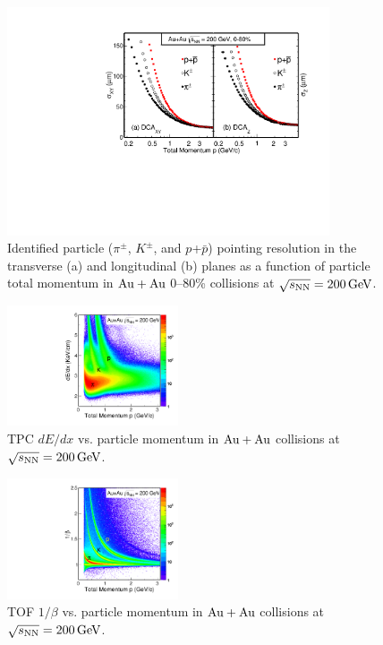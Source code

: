\documentclass[%
 reprint,	
 amsmath,amssymb,
 aps,
 prc,
]{revtex4-1}
\begin{document}
\begin{figure}
\centering
\includegraphics[width=0.85\textwidth]{fig/DCAXy_Z.pdf}
\caption{Identified particle ($\pi^{\pm}$, $K^{\pm}$, and $p$+$\bar{p}$) pointing resolution in the transverse (a) and longitudinal (b) planes as a function of particle total momentum in ${\rm{Au + Au}}$ 0--80\% collisions at ${\sqrt{s_{\rm NN}} = \rm{200\,GeV}}$.}
\label{fig:DCAXy_Z} 
\end{figure}

\begin{figure}[h]
\centering
\includegraphics[width=0.45\textwidth]{fig/PID_dEdx.pdf}
\caption{TPC $dE/dx$ vs. particle momentum in ${\rm{Au + Au}}$ collisions at ${\sqrt{s_{\rm NN}} = \rm{200\,GeV}}$.}
\label{fig:PID_dEdx} 
\end{figure}

\begin{figure}[h]
\centering
\includegraphics[width=0.45\textwidth]{fig/PID_beta.pdf}
\caption{TOF $1/\beta$ vs. particle momentum in ${\rm{Au + Au}}$ collisions at ${\sqrt{s_{\rm NN}} = \rm{200\,GeV}}$.}
\label{fig:PID_beta} 
\end{figure}
\end{document}
